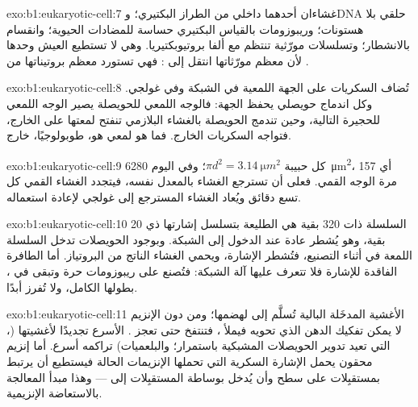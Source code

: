\begin{solution}{exo:b1:eukaryotic-cell:7}
غشاءان أحدهما داخلي من الطراز البكتيري؛ وDNA حلقي بلا هستونات؛
وريبوزومات بالقياس البكتيري حساسة للمضادات الحيوية؛ وانقسام
بالانشطار؛ وتسلسلات مورّثية تنتظم مع ألفا بروتيوبكتيريا. وهي لا
تستطيع العيش وحدها لأن معظم مورّثاتها انتقل إلى : فهي تستورد
معظم بروتيناتها من .
\end{solution}

\begin{solution}{exo:b1:eukaryotic-cell:8}
تُضاف السكريات على الجهة اللمعية في الشبكة وفي غولجي. وكل اندماج
حويصلي يحفظ الجهة: فالوجه اللمعي للحويصلة يصير الوجه اللمعي للحجيرة
التالية، وحين تندمج الحويصلة بالغشاء البلازمي تنفتح لمعتها على
الخارج، فتواجه السكريات الخارج. فما هو لمعي هو، طوبولوجيًا، خارج.
\end{solution}

\begin{solution}{exo:b1:eukaryotic-cell:9}
كل حبيبة $\pi d^2 = \qty{3.14}{\micro m^2}$؛ وفي اليوم
\qty{6280}{\micro m^2}، أي \qty{157}{} مرة الوجه القمي. فعلى 
أن تسترجع الغشاء  بالمعدل نفسه، فيتجدد الغشاء القمي
كل تسع دقائق ويُعاد الغشاء المسترجع إلى غولجي لإعادة استعماله.
\end{solution}

\begin{solution}{exo:b1:eukaryotic-cell:10}
السلسلة ذات \qty{320}{} بقية هي الطليعة بتسلسل إشارتها ذي \qty{20}{}
بقية، وهو يُشطر عادة عند الدخول إلى الشبكة. وبوجود الحويصلات تدخل
السلسلة اللمعة في أثناء التصنيع، فتُشطر الإشارة، ويحمي الغشاء الناتج
من البروتياز. أما الطافرة الفاقدة للإشارة فلا تتعرف عليها آلة
الشبكة: فتُصنع على ريبوزومات حرة وتبقى في ، بطولها
الكامل، ولا تُفرز أبدًا.
\end{solution}

\begin{solution}{exo:b1:eukaryotic-cell:11}
الأغشية المدخَلة   البالية تُسلَّم إلى
 لهضمها؛ ومن دون الإنزيم لا يمكن تفكيك الدهن الذي
تحويه فيملأ ، فتنتفخ حتى تعجز .  الأسرع
تجديدًا لأغشيتها (، التي تعيد تدوير الحويصلات المشبكية
باستمرار؛ والبلعميات) تراكمه أسرع. أما إنزيم محقون يحمل الإشارة
السكرية التي تحملها الإنزيمات الحالة فيستطيع أن يرتبط بمستقبِلات على
سطح  وأن يُدخل  بوساطة المستقبِلات إلى  --- وهذا مبدأ المعالجة بالاستعاضة الإنزيمية.
\end{solution}

